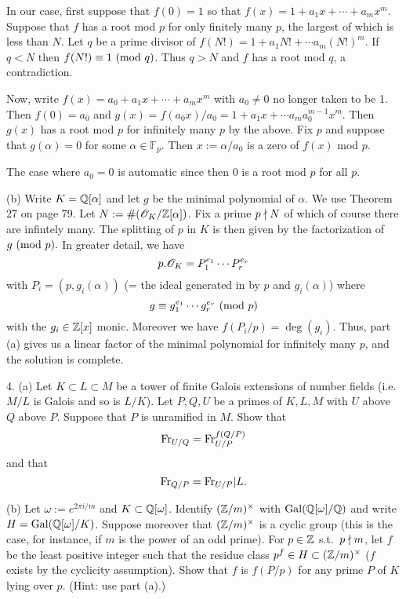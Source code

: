 \documentclass[10pt,a4paper,reqno]{amsart}
\begin{document}
In our case, first suppose that $f(0)=1$ so that $f(x) = 1+a_1 x + \cdots + a_m
x^m$. Suppose that $f$ has a root mod $p$ for only finitely many $p$, the
largest of which is less than $N$. Let $q$ be a prime divisor of $f(N!) = 1+a_1
N! + \cdots a_m (N!)^m.$ If $q < N$ then $f(N!) \equiv 1 \text{ } (\mathrm{mod}\text{ } q)$. Thus $q >
N$ and $f$ has a root mod $q$, a contradiction.

Now, write $f(x) = a_0+a_1 x + \cdots + a_m x^m$ with $a_0\neq 0$ no longer
taken to be 1. Then $f(0) = a_0$ and $g(x) = f(a_0 x)/ a_0 = 1+ a_1 x + \cdots
a_m a_0^{m-1} x^m$. Then $g(x)$ has a root mod $p$ for infinitely many $p$ by
the above. Fix $p$ and suppose that $g(\alpha) = 0$ for some $\alpha\in
\mathbb{F}_p$. Then $x := \alpha/a_0$ is a zero of $f(x)$ mod $p$.

The case where $a_0 = 0$ is automatic since then $0$ is a root mod $p$ for all
$p$.

(b) Write $K = \mathbb{Q}[\alpha]$ and let $g$ be the minimal polynomial of $\alpha$.
We use Theorem 27 on page 79. Let $N := \#(\mathscr{O}_K/\mathbb{Z}[\alpha])$. Fix a prime
$p\nmid N$ of which of course there are infintely many. The splitting of $p$
in $K$ is then given by the factorization of $g \text{ } (\mathrm{mod}\text{ } p).$ In greater detail,
we have \[p.\mathscr{O}_K = P_1^{e_1} \cdots P_r^{e_r}\] with $P_i = (p,g_i(\alpha))$ (=
the ideal generated in \OK{} by $p$ and $g_i(\alpha)$) where \[g \equiv
g_1^{e_1} \cdots g_r^{e_r} \text{ } (\mathrm{mod}\text{ } p)\] with the $g_i\in \mathbb{Z}[x]$ monic. Moreover
we have $f(P_i/p) = \deg(g_i)$. Thus, part (a) gives us a linear factor of
the minimal polynomial for infinitely many $p$, and the solution is complete.

\bigskip

4. (a) Let $K \subset L \subset M$ be a tower of finite Galois extensions of
number fields (i.e. $M/L$ is Galois and so is $L/K$). Let $P,Q,U$ be a primes
of $K,L,M$ with $U$ above $Q$ above $P$. Suppose that $P$ is unramified in
$M$. Show that \[\mathrm{Fr}_{U/Q} = \mathrm{Fr}_{U/P}^{f(Q/P)}\] and that \[\mathrm{Fr}_{Q/P} =
\mathrm{Fr}_{U/P}|L.\]

(b) Let $\omega := e^{2\pi i/m}$ and $K\subset \mathbb{Q}[\omega]$. Identify
$(\mathbb{Z}/m)^\times$ with $\mathrm{Gal}(\mathbb{Q}[\omega]/\mathbb{Q})$ and write $H = \mathrm{Gal}(\mathbb{Q}[\omega]/K)$.
Suppose moreover that $(\mathbb{Z}/m)^\times$ is a cyclic group (this is the case, for
instance, if $m$ is the power of an odd prime). For $p\in \mathbb{Z}$ s.t.~$p\nmid m$,
let $f$ be the least positive integer such that the residue class $p^f \in H
\subset (\mathbb{Z}/m)^\times$ ($f$ exists by the cyclicity assumption). Show that $f$
is $f(P/p)$ for any prime $P$ of $K$ lying over $p$. (Hint: use part (a).)
\end{document}
